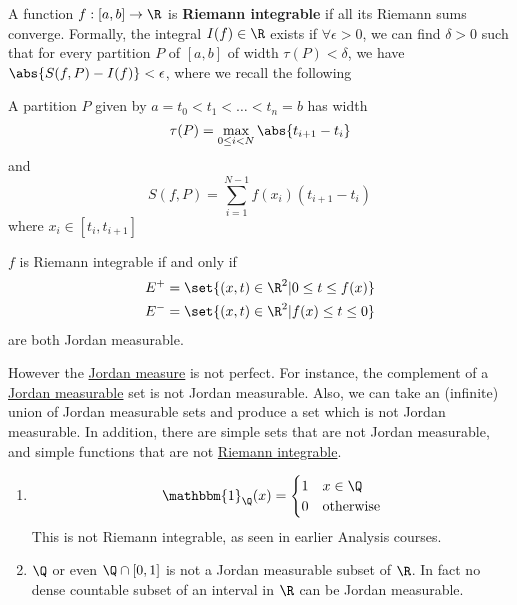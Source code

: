 \documentclass{article}
\newcommand{\1}[1]{\mathbbm{1}_{#1}}
\begin{document}
\begin{defi}
    A function $f:[a, b] \to \R$ is \textbf{Riemann integrable} if all its Riemann sums converge.
    Formally, the integral $I(f) \in \R$ exists if $\forall \epsilon > 0$, we can find $\delta > 0$ such that for every partition $P$ of $[a, b]$ of width $\tau(P) < \delta$, we have $\abs{S(f, P) - I(f)} < \epsilon$, where we recall the following

    A partition $P$ given by $a = t_0 < t_1 < \dots < t_n = b$ has width
    \begin{equation*}
        \tau(P) = \max_{0 \leq i < N} \abs{t_{i+1} - t_i}
    \end{equation*}
    and
    \begin{equation*}
        S(f, P) = \sum_{i=1}^{N-1} f(x_i) (t_{i+1} - t_i)
    \end{equation*}
    where $x_i \in [t_i, t_{i+1}]$
\end{defi}

\begin{prop}
    $f$ is Riemann integrable if and only if
    \begin{align*}
        E^+ &= \set{(x, t) \in \R^2 | 0 \leq t \leq f(x)} \\
        E^- &= \set{(x, t) \in \R^2 | f(x) \leq t \leq 0}
    \end{align*}
    are both Jordan measurable.
\end{prop}

However the \hyperlink{def:jMeasure}{Jordan measure} is not perfect. For instance, the complement of a \hyperlink{def:jMeasurable}{Jordan measurable} set is not Jordan measurable.
Also, we can take an (infinite) union of Jordan measurable sets and produce a set which is not Jordan measurable.
In addition, there are simple sets that are not Jordan measurable, and simple functions that are not \hyperlink{def:riemannIntegrable}{Riemann integrable}.

\begin{eg}
    \leavevmode
    \begin{enumerate}[label=(\emph{\roman*})]
        \item
            \begin{equation*}
                \1{\Q}(x) = \begin{cases}
                    1 & x \in \Q \\
                    0 & \text{otherwise}
                \end{cases}
             \end{equation*}
            This is not Riemann integrable, as seen in earlier Analysis courses.
        \item $\Q$ or even $\Q \cap [0, 1]$ is not a Jordan measurable subset of $\R$.
            In fact no dense countable subset of an interval in $\R$ can be Jordan measurable.
    \end{enumerate}
\end{eg}
\end{document}
